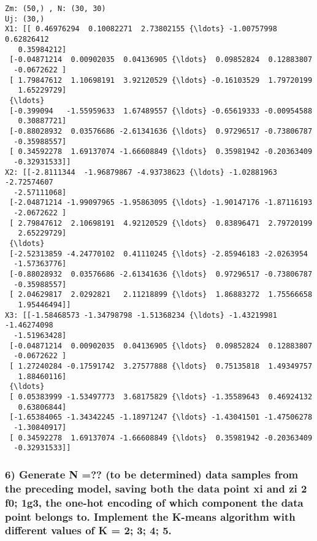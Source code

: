 \documentclass[11pt]{article}
\begin{document}
    \begin{Verbatim}[commandchars=\\\{\}]
Zm: (50,) , N: (30, 30)
Uj: (30,)
X1: [[ 0.46976294  0.10082271  2.73802155 {\ldots} -1.00757998  0.62826412
   0.35984212]
 [-0.04871214  0.00902035  0.04136905 {\ldots}  0.09852824  0.12883807
  -0.0672622 ]
 [ 1.79847612  1.10698191  3.92120529 {\ldots} -0.16103529  1.79720199
   1.65229729]
 {\ldots}
 [-0.399094   -1.55959633  1.67489557 {\ldots} -0.65619333 -0.00954588
   0.30887721]
 [-0.88028932  0.03576686 -2.61341636 {\ldots}  0.97296517 -0.73806787
  -0.35988557]
 [ 0.34592278  1.69137074 -1.66608849 {\ldots}  0.35981942 -0.20363409
  -0.32931533]]
X2: [[-2.8111344  -1.96879867 -4.93738623 {\ldots} -1.02881963 -2.72574607
  -2.57111068]
 [-2.04871214 -1.99097965 -1.95863095 {\ldots} -1.90147176 -1.87116193
  -2.0672622 ]
 [ 2.79847612  2.10698191  4.92120529 {\ldots}  0.83896471  2.79720199
   2.65229729]
 {\ldots}
 [-2.52313859 -4.24770102  0.41110245 {\ldots} -2.85946183 -2.0263954
  -1.57363776]
 [-0.88028932  0.03576686 -2.61341636 {\ldots}  0.97296517 -0.73806787
  -0.35988557]
 [ 2.04629817  2.0292821   2.11218899 {\ldots}  1.86883272  1.75566658
   1.95446494]]
X3: [[-1.58468573 -1.34798798 -1.51368234 {\ldots} -1.43219981 -1.46274098
  -1.51963428]
 [-0.04871214  0.00902035  0.04136905 {\ldots}  0.09852824  0.12883807
  -0.0672622 ]
 [ 1.27240284 -0.17591742  3.27577888 {\ldots}  0.75135818  1.49349757
   1.88460116]
 {\ldots}
 [ 0.05383999 -1.53497773  3.68175829 {\ldots} -1.35589643  0.46924132
   0.63806844]
 [-1.65384065 -1.34342245 -1.18971247 {\ldots} -1.43041501 -1.47506278
  -1.30840917]
 [ 0.34592278  1.69137074 -1.66608849 {\ldots}  0.35981942 -0.20363409
  -0.32931533]]

    \end{Verbatim}

    \subsubsection{6) Generate N =?? (to be determined) data samples from
the preceding model, saving both the data point xi and zi 2 f0; 1g3, the
one-hot encoding of which component the data point belongs to. Implement
the K-means algorithm with different values of K = 2; 3; 4;
5.}\label{generate-n-to-be-determined-data-samples-from-the-preceding-model-saving-both-the-data-point-xi-and-zi-2-f0-1g3-the-one-hot-encoding-of-which-component-the-data-point-belongs-to.-implement-the-k-means-algorithm-with-different-values-of-k-2-3-4-5.}
\end{document}

